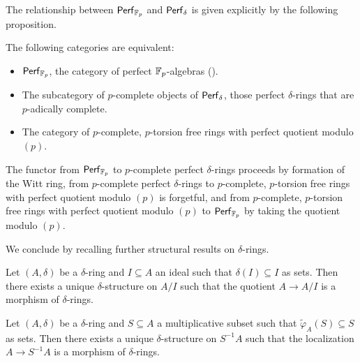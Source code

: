 The relationship between $\mathsf{Perf}_{\mathbb{F}_{p}}$ and $\mathsf{Perf}_{\delta}$ is given explicitly by the following proposition. 
\begin{proposition}\label{prop: equivalence of categories}
    The following categories are equivalent:
    \begin{itemize}
        \item $\mathsf{Perf}_{\mathbb{F}_{p}}$, the category of perfect $\mathbb{F}_{p}$-algebras ().  
        \item The subcategory of $p$-complete objects of $\mathsf{Perf}_{\delta}$, those perfect $\delta$-rings that are $p$-adically complete. 
        \item The category of $p$-complete, $p$-torsion free rings with perfect quotient modulo $(p)$. 
    \end{itemize}
\end{proposition}
\begin{remark}
    The functor from $\mathsf{Perf}_{\mathbb{F}_{p}}$ to $p$-complete perfect $\delta$-rings proceeds by formation of the Witt ring, from $p$-complete perfect $\delta$-rings to $p$-complete, $p$-torsion free rings with perfect quotient modulo $(p)$ is forgetful, and from $p$-complete, $p$-torsion free rings with perfect quotient modulo $(p)$ to $\mathsf{Perf}_{\mathbb{F}_{p}}$ by taking the quotient modulo $(p)$. 
\end{remark}

We conclude by recalling further structural results on $\delta$-rings. 
\begin{lemma}\label{lem: quoteints of delta rings}
    Let $(A,\delta)$ be a $\delta$-ring and $I\subseteq A$ an ideal such that $\delta(I)\subseteq I$ as sets. Then there exists a unique $\delta$-structure on $A/I$ such that the quotient $A\to A/I$ is a morphism of $\delta$-rings.
\end{lemma}
\begin{lemma}\label{lem: localizations of delta rings}
    Let $(A,\delta)$ be a $\delta$-ring and $S\subseteq A$ a multiplicative subset such that $\widetilde{\varphi}_{A}(S)\subseteq S$ as sets. Then there exists a unique $\delta$-structure on $S^{-1}A$ such that the localization $A\to S^{-1}A$ is a morphism of $\delta$-rings. 
\end{lemma}